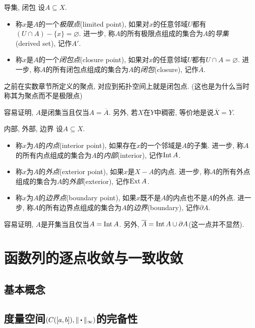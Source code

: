 \begin{definition}{导集, 闭包}
	设$A \subseteq X$. 
	\begin{itemize}
		\item 称$x$是$A$的一个\textit{极限点}(limited point), 如果对$x$的任意邻域$U$都有$(U \cap A) - \{ x \} = \varnothing$. 进一步, 称$A$的所有极限点组成的集合为$A$的\textit{导集}(derived set), 记作$A'$. 
		\item 称$x$是$A$的一个\textit{闭包点}(closure point), 如果对$x$的任意邻域$U$都有$U \cap A = \varnothing$. 进一步, 称$A$的所有闭包点组成的集合为$A$的\textit{闭包}(closure), 记作$\overline{A}$. 
	\end{itemize}
\end{definition}
\begin{remark}
	之前在实数章节所定义的聚点, 对应到拓扑空间上就是闭包点. (这也是为什么当时称其为聚点而不是极限点)
\end{remark}

容易证明, $A$是闭集当且仅当$A=\overline{A}$. 另外, 若$X$在$Y$中稠密, 等价地是说$\overline{X}=Y$. 

\begin{definition}{内部, 外部, 边界}
	设$A \subseteq X$. 
	\begin{itemize}
		\item 称$x$为$A$的\textit{内点}(interior point), 如果存在$x$的一个邻域是$A$的子集. 进一步, 称$A$的所有内点组成的集合为$A$的\textit{内部}(interior), 记作$\operatorname{Int} A$. 
		\item 称$x$为$A$的\textit{外点}(exterior point), 如果$x$是$X-A$的内点. 进一步, 称$A$的所有外点组成的集合为$A$的\textit{外部}(exterior), 记作$\operatorname{Ext} A$. 
		\item 称$x$为$A$的\textit{边界点}(boundary point), 如果$x$既不是$A$的内点也不是$A$的外点. 进一步, 称$A$的所有边界点组成的集合为$A$的\textit{边界}(boundary), 记作$\partial A$. 
	\end{itemize}
\end{definition}

容易证明, $A$是开集当且仅当$A= \operatorname{Int} A$. 另外, $\overline{A} = \operatorname{Int} A \cup \partial A$(这一点并不显然). 



\newpage
\section{函数列的逐点收敛与一致收敛}

\subsection{基本概念}

\subsection{度量空间$(C([a,b]),\| \bigcdot \|_{\infty})$的完备性}






























